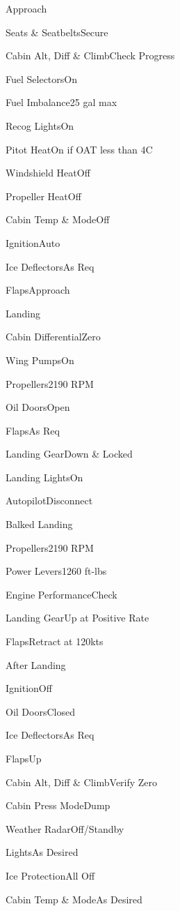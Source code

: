 \documentclass[sim-use]{checklist}
\begin{document}
\begin{checklist}{Approach}
  \item{Seats \& Seatbelts}{Secure}
  \item{Cabin Alt, Diff \& Climb}{Check Progress}
  \item{Fuel Selectors}{On}
  \item{Fuel Imbalance}{25 gal max}
  \item{Recog Lights}{On}
  \item{Pitot Heat}{On if OAT less than 4C}
  \item{Windshield Heat}{Off}
  \item{Propeller Heat}{Off}
  \item{Cabin Temp \& Mode}{Off}
  \item{Ignition}{Auto}
  \item{Ice Deflectors}{As Req}
  \item{Flaps}{Approach}
\end{checklist}

\begin{checklist}{Landing}
  \item{Cabin Differential}{Zero}
  \item{Wing Pumps}{On}
  \item{Propellers}{2190 RPM}
  \item{Oil Doors}{Open}
  \item{Flaps}{As Req}
  \item{Landing Gear}{Down \& Locked}
  \item{Landing Lights}{On}
  \item{Autopilot}{Disconnect}
\end{checklist}

\begin{checklist}{Balked Landing}
  \item{Propellers}{2190 RPM}
  \item{Power Levers}{1260 ft-lbs}
  \item{Engine Performance}{Check}
  \item{Landing Gear}{Up at Positive Rate}
  \item{Flaps}{Retract at 120kts}
\end{checklist}

\begin{checklist}{After Landing}
  \item{Ignition}{Off}
  \item{Oil Doors}{Closed}
  \item{Ice Deflectors}{As Req}
  \item{Flaps}{Up}
  \item{Cabin Alt, Diff \& Climb}{Verify Zero}
  \item{Cabin Press Mode}{Dump}
  \item{Weather Radar}{Off/Standby}
  \item{Lights}{As Desired}
  \item{Ice Protection}{All Off}
  \item{Cabin Temp \& Mode}{As Desired}
\end{checklist}
\end{document}
